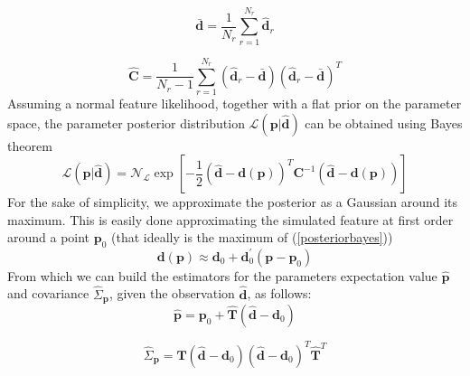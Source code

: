 \documentclass[reprint,aps,prd,superscriptaddress,showkeys,showpacs]{revtex4-1}
\newcommand{\bb}[1]{\mathbf{#1}}
\newcommand{\bbh}[1]{\mathbf{\hat{#1}}}
\newcommand{\h}[1]{\hat{#1}}
\begin{document}
\begin{equation}
\bb{\bar{d}} = \frac{1}{N_r}\sum_{r=1}^{N_r} \bbh{d}_r
\end{equation}

\begin{equation}
\label{covest}
\bbh{C} = \frac{1}{N_r-1}\sum_{r=1}^{N_r} (\bbh{d}_r - \bar{\bb{d}}) (\bbh{d}_r - \bar{\bb{d}})^T
\end{equation}
%
Assuming a normal feature likelihood, together with a flat prior on the parameter space, the parameter posterior distribution $\mathcal{L}(\bb{p}\vert\bbh{d})$ can be obtained using Bayes theorem
\begin{equation}
\label{posteriorbayes}
\mathcal{L}(\bb{p}\vert\bbh{d}) = \mathcal{N}_\mathcal{L}\exp{\left[-\frac{1}{2}(\bbh{d}-\bb{d}(\bb{p}))^T\bb{C}^{-1}(\bbh{d}-\bb{d}(\bb{p}))\right]}
\end{equation}
%
For the sake of simplicity, we approximate the posterior as a Gaussian around its maximum. This is easily done approximating the simulated feature at first order around a point $\bb{p}_0$ (that ideally is the maximum of (\ref{posteriorbayes}))
\begin{equation}
\bb{d}(\bb{p}) \approx \bb{d}_0 + \bb{d}_0^\prime(\bb{p}-\bb{p}_0) 
\end{equation}
%
From which we can build the estimators for the parameters expectation value $\bbh{p}$ and covariance $\h{\Sigma}_\bb{p}$, given the observation $\bbh{d}$, as follows:
%
\begin{equation}
\label{estimatormean}
\bbh{p} = \bb{p}_0 + \bbh{T}(\bbh{d}-\bb{d}_0)
\end{equation}

\begin{equation}
\label{estimatorcovariance}
\h{\Sigma}_\bb{p} = \bbh{T}(\bbh{d}-\bb{d}_0)(\bbh{d}-\bb{d}_0)^T\bbh{T}^T
\end{equation}
\end{document}
